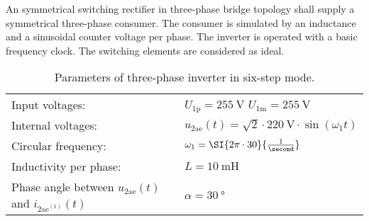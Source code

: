 





An symmetrical switching rectifier in three-phase bridge topology shall supply a
symmetrical three-phase consumer. The consumer is simulated by an inductance and 
a sinusoidal counter voltage per phase. The inverter is operated with a basic frequency clock.
The switching elements are considered as ideal.

% 


\begin{table}[ht]
    \centering  %
    \begin{tabular}{ll}
        \toprule
        Input voltages: & $U_\mathrm{1p}=\SI{255}{\volt}$ \quad $U_\mathrm{1m}=\SI{255}{\volt}$ \\
        Internal voltages: & $u_{\mathrm{2ae}}(t) = \sqrt{2} \cdot \SI{220}{\volt} \cdot \sin(\omega_1t)$ \\
        Circular frequency: & $\omega_1 = \SI{2 \pi \cdot 30}{\frac{1}{\second}}$ \\ 
        Inductivity per phase: & $L= \SI{10}{\milli \henry}$ \\
        Phase angle between  $u_{\mathrm{2ae}}(t)$ and $i_{\mathrm{2ae}^\mathrm{(1)}}(t)$ & $\alpha=\SI{30}{\degree}$ \\
        \bottomrule
    \end{tabular}
    \caption{Parameters of three-phase inverter in six-step mode.}  
    \label{table:ex07_Task2_ParametersOfTheCircuit}
\end{table}


